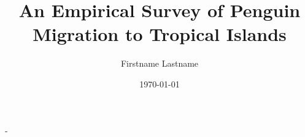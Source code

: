 \documentclass[11pt, a4paper]{memoir}
\title{An Empirical Survey of Penguin Migration to Tropical Islands}
\author{Firstname Lastname}
\date{\mydate \today}
\numberwithin{equation}{chapter}
\theoremstyle{nonumberplain}
\begin{document}
\frontmatter

\begin{titlingpage}
  \calccentering{\unitlength}
  \begin{adjustwidth*}{\unitlength-24pt}{-\unitlength-24pt}
    \maketitle
  \end{adjustwidth*}
\end{titlingpage}

 
\thispagestyle{empty}
\cleardoublepage
    
    

\thispagestyle{empty}
\cleardoublepage
    

\thispagestyle{empty}
\cleardoublepage


\cleardoublepage

{
\hypersetup{linkcolor=black}
\cleartorecto
\tableofcontents*
}


\ 
\thispagestyle{empty}

\mainmatter








\appendix



\backmatter



\end{document}
